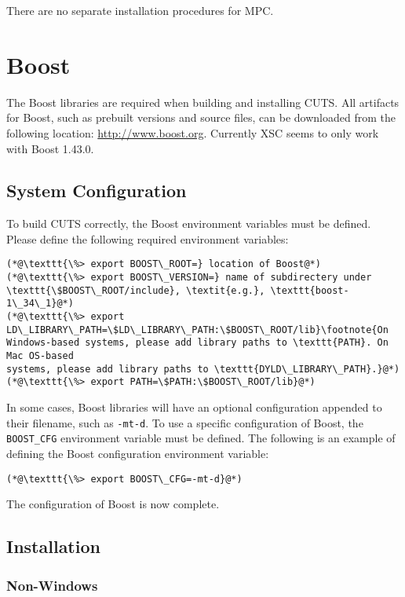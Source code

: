 There are no separate installation procedures for MPC.

\section{Boost}
\label{sec:thirdparty-boost}

The Boost libraries are required when building and installing CUTS. All
artifacts for Boost, such as prebuilt versions and source files, can be 
downloaded from the following location: \url{http://www.boost.org}. Currently XSC seems to only work with Boost 1.43.0.

\subsection{System Configuration}

To build CUTS correctly, the Boost environment variables must be defined. Please 
define the following required environment variables:
\begin{lstlisting}
(*@\texttt{\%> export BOOST\_ROOT=} location of Boost@*)
(*@\texttt{\%> export BOOST\_VERSION=} name of subdirectery under \texttt{\$BOOST\_ROOT/include}, \textit{e.g.}, \texttt{boost-1\_34\_1}@*)
(*@\texttt{\%> export LD\_LIBRARY\_PATH=\$LD\_LIBRARY\_PATH:\$BOOST\_ROOT/lib}\footnote{On
Windows-based systems, please add library paths to \texttt{PATH}. On Mac OS-based
systems, please add library paths to \texttt{DYLD\_LIBRARY\_PATH}.}@*)
(*@\texttt{\%> export PATH=\$PATH:\$BOOST\_ROOT/lib}@*)
\end{lstlisting}
In some cases, Boost libraries will have an optional configuration appended to 
their filename, such as \texttt{-mt-d}. To use a specific configuration of 
Boost, the \texttt{BOOST\_CFG} environment variable must be defined. The 
following is an example of defining the Boost configuration environment 
variable:
\begin{lstlisting}
(*@\texttt{\%> export BOOST\_CFG=-mt-d}@*)
\end{lstlisting}
The configuration of Boost is now complete. 

\subsection{Installation}

\subsubsection{Non-Windows}
 
